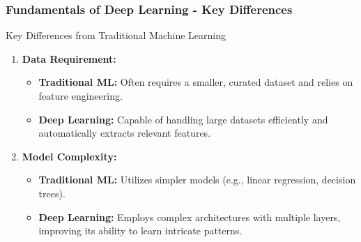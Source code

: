 \documentclass{beamer}
\begin{document}
\begin{frame}[fragile]
    \frametitle{Fundamentals of Deep Learning - Key Differences}
    \begin{block}{Key Differences from Traditional Machine Learning}
        \begin{enumerate}
            \item \textbf{Data Requirement:}
                \begin{itemize}
                    \item \textbf{Traditional ML:} Often requires a smaller, curated dataset and relies on feature engineering.
                    \item \textbf{Deep Learning:} Capable of handling large datasets efficiently and automatically extracts relevant features.
                \end{itemize}
            \item \textbf{Model Complexity:}
                \begin{itemize}
                    \item \textbf{Traditional ML:} Utilizes simpler models (e.g., linear regression, decision trees).
                    \item \textbf{Deep Learning:} Employs complex architectures with multiple layers, improving its ability to learn intricate patterns.
                \end{itemize}
        \end{enumerate}
    \end{block}
\end{frame}
\end{document}
